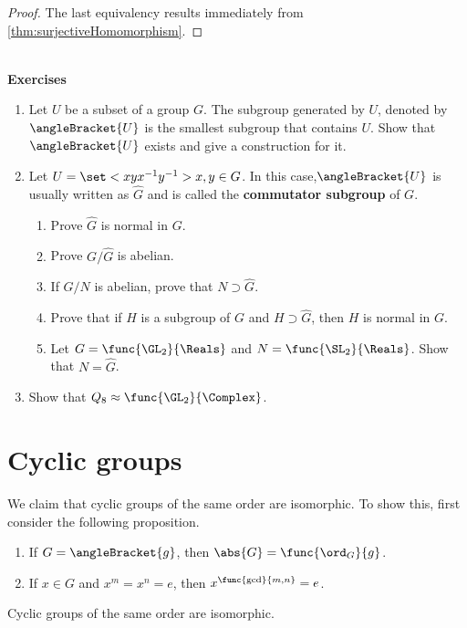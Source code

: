 \begin{proof}
    The last equivalency results immediately from \ref{thm:surjectiveHomomorphism}. 
\end{proof}
\ \\ 
{\Large{\textbf{Exercises}}}
\begin{enumerate}
    \item Let \(U\) be a subset of a group \(G\). The subgroup generated by \(U\), denoted by \(\angleBracket{U}\) is the smallest subgroup that contains \(U\). Show that \(\angleBracket{U}\) exists and give a construction for it.
    \item Let \(U = \set<xyx^{-1}y^{-1}>{x,y \in G}\). In this case,\(\angleBracket{U}\) is usually written as \(\hat{G}\) and is called the \textbf{commutator subgroup} of \(G\).
    \begin{enumerate}
        \item Prove \(\hat{G}\) is normal in \(G\).
        \item Prove \(G/\hat{G}\) is abelian.
        \item If \(G/N\) is abelian, prove that \(N \supset \hat{G}\).
        \item Prove that if \(H\) is a subgroup of \(G\) and \(H \supset \hat{G}\), then \(H\) is normal in \(G\).
        \item Let \(G = \func{\GL_2}{\Reals}\) and \(N = \func{\SL_2}{\Reals}\). Show that \(N = \hat{G}\).
    \end{enumerate}
        \item Show that \(Q_8 \approx \func{\GL_2}{\Complex}\).
\end{enumerate}
\section{Cyclic groups}
We claim that cyclic groups of the same order are isomorphic. To show this, first consider the following proposition.

\begin{proposition}
    \begin{enumerate}
        \item If \(G = \angleBracket{g}\), then \(\abs{G} = \func{\ord_G}{g}\).
        \item If \(x \in G\) and \(x^m = x^n = e\), then \(x^{\func{\gcd}{m,n}} = e\).
    \end{enumerate}
\end{proposition}

\begin{theorem}
    Cyclic groups of the same order are isomorphic.
\end{theorem}

